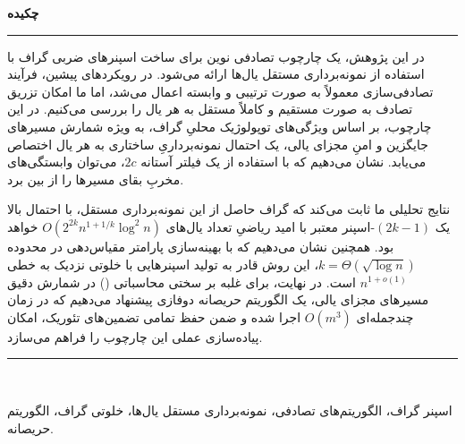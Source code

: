 \documentclass[11pt,a4paper]{report}
\theoremstyle{plain}
\theoremstyle{definition}
\theoremstyle{remark}
\begin{document}
\newpage
\vspace*{0.5cm}
\thispagestyle{plain}
\begin{center}
\LARGE\textbf{چکیده}
\end{center}
\noindent\rule{\textwidth}{1pt}\par
در این پژوهش، یک چارچوب تصادفی نوین برای ساخت اسپنرهای ضربی گراف با استفاده از نمونه‌برداری مستقل یال‌ها ارائه می‌شود. در رویکردهای پیشین، فرآیند تصادفی‌سازی معمولاً به صورت ترتیبی و وابسته اعمال می‌شد، اما ما امکان تزریق تصادف به صورت مستقیم و کاملاً مستقل به هر یال را بررسی می‌کنیم. در این چارچوب، بر اساس ویژگی‌های توپولوژیک محلیِ گراف، به ویژه شمارش مسیرهای جایگزین و امنِ مجزای یالی، یک احتمال نمونه‌برداریِ ساختاری به هر یال اختصاص می‌یابد. نشان می‌دهیم که با استفاده از یک فیلتر آستانه $2c$، می‌توان وابستگی‌های مخربِ بقای مسیرها را از بین برد. 

نتایج تحلیلی ما ثابت می‌کند که گراف حاصل از این نمونه‌برداری مستقل، با احتمال بالا یک $(2k-1)$-اسپنر معتبر با امید ریاضیِ تعداد یال‌های $O(2^{2k} n^{1+1/k} \log^2 n)$ خواهد بود. همچنین نشان می‌دهیم که با بهینه‌سازی پارامتر مقیاس‌دهی در محدوده $k = \Theta(\sqrt{\log n})$، این روش قادر به تولید اسپنرهایی با خلوتی نزدیک به خطی $n^{1+o(1)}$ است. در نهایت، برای غلبه بر سختی محاسباتی () در شمارش دقیق مسیرهای مجزای یالی، یک الگوریتم حریصانه دوفازی پیشنهاد می‌دهیم که در زمان چندجمله‌ای $O(m^3)$ اجرا شده و ضمن حفظ تمامی تضمین‌های تئوریک، امکان پیاده‌سازی عملی این چارچوب را فراهم می‌سازد.
\par
\vspace{-2mm}\noindent\rule{\textwidth}{1pt}\\
\begin{description}[leftmargin=0cm]
\item[کلیدواژه‌ها:]
اسپنر گراف، الگوریتم‌های تصادفی، نمونه‌برداری مستقل یال‌ها، خلوتی گراف، الگوریتم حریصانه.
\end{description}
\newpage
\pagestyle{plain}
\tableofcontents
\newpage
{}
\end{document}
